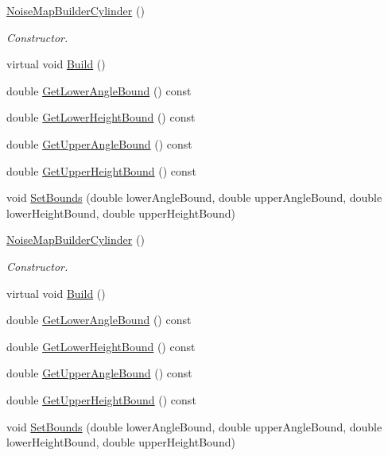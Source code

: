 \begin{DoxyCompactItemize}
\item 
\hyperlink{classnoise_1_1utils_1_1_noise_map_builder_cylinder_a31178dd76e9f62d682f52abdbb51e4b2}{Noise\+Map\+Builder\+Cylinder} ()
\begin{DoxyCompactList}\small\item\em Constructor. \end{DoxyCompactList}\item 
virtual void \hyperlink{classnoise_1_1utils_1_1_noise_map_builder_cylinder_a684d087e172d16c1c754e48c69ac12a0}{Build} ()
\item 
double \hyperlink{classnoise_1_1utils_1_1_noise_map_builder_cylinder_a0635e00f0a9b0e6302576268c0d5e3af}{Get\+Lower\+Angle\+Bound} () const 
\item 
double \hyperlink{classnoise_1_1utils_1_1_noise_map_builder_cylinder_ad2accfd3d9cf4fd851a8bc9ce332816a}{Get\+Lower\+Height\+Bound} () const 
\item 
double \hyperlink{classnoise_1_1utils_1_1_noise_map_builder_cylinder_ac29d2bd03c6d948e4e1ee7c27cbccfeb}{Get\+Upper\+Angle\+Bound} () const 
\item 
double \hyperlink{classnoise_1_1utils_1_1_noise_map_builder_cylinder_a7237ee50f47cdc53400a253595c7ff43}{Get\+Upper\+Height\+Bound} () const 
\item 
void \hyperlink{classnoise_1_1utils_1_1_noise_map_builder_cylinder_ab699795566901fef4c86dbf1db51ae3a}{Set\+Bounds} (double lower\+Angle\+Bound, double upper\+Angle\+Bound, double lower\+Height\+Bound, double upper\+Height\+Bound)
\item 
\hyperlink{classnoise_1_1utils_1_1_noise_map_builder_cylinder_a33ba1fa029084f4e3c9a9d377279f13d}{Noise\+Map\+Builder\+Cylinder} ()
\begin{DoxyCompactList}\small\item\em Constructor. \end{DoxyCompactList}\item 
virtual void \hyperlink{classnoise_1_1utils_1_1_noise_map_builder_cylinder_a0c136038ea3fa328962c437a28269726}{Build} ()
\item 
double \hyperlink{classnoise_1_1utils_1_1_noise_map_builder_cylinder_a0635e00f0a9b0e6302576268c0d5e3af}{Get\+Lower\+Angle\+Bound} () const 
\item 
double \hyperlink{classnoise_1_1utils_1_1_noise_map_builder_cylinder_ad2accfd3d9cf4fd851a8bc9ce332816a}{Get\+Lower\+Height\+Bound} () const 
\item 
double \hyperlink{classnoise_1_1utils_1_1_noise_map_builder_cylinder_ac29d2bd03c6d948e4e1ee7c27cbccfeb}{Get\+Upper\+Angle\+Bound} () const 
\item 
double \hyperlink{classnoise_1_1utils_1_1_noise_map_builder_cylinder_a7237ee50f47cdc53400a253595c7ff43}{Get\+Upper\+Height\+Bound} () const 
\item 
void \hyperlink{classnoise_1_1utils_1_1_noise_map_builder_cylinder_ab699795566901fef4c86dbf1db51ae3a}{Set\+Bounds} (double lower\+Angle\+Bound, double upper\+Angle\+Bound, double lower\+Height\+Bound, double upper\+Height\+Bound)
\end{DoxyCompactItemize}
